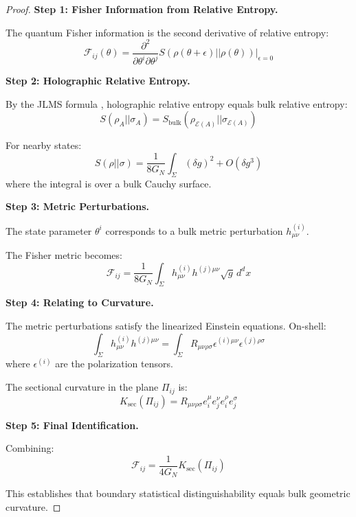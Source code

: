 \documentclass[12pt,a4paper]{article}
\begin{document}
\begin{proof}
\textbf{Step 1: Fisher Information from Relative Entropy.}

The quantum Fisher information is the second derivative of relative entropy:
\begin{equation}
\mathcal{F}_{ij}(\theta) = \frac{\partial^2}{\partial \theta^i \partial \theta^j} S(\rho(\theta + \epsilon) || \rho(\theta))\Big|_{\epsilon = 0}
\end{equation}

\textbf{Step 2: Holographic Relative Entropy.}

By the JLMS formula \cite{jafferis2016}, holographic relative entropy equals bulk relative entropy:
\begin{equation}
S(\rho_A || \sigma_A) = S_{\text{bulk}}(\rho_{\mathcal{E}(A)} || \sigma_{\mathcal{E}(A)})
\end{equation}

For nearby states:
\begin{equation}
S(\rho || \sigma) = \frac{1}{8G_N} \int_\Sigma (\delta g)^2 + O(\delta g^3)
\end{equation}
where the integral is over a bulk Cauchy surface.

\textbf{Step 3: Metric Perturbations.}

The state parameter $\theta^i$ corresponds to a bulk metric perturbation $h^{(i)}_{\mu\nu}$.

The Fisher metric becomes:
\begin{equation}
\mathcal{F}_{ij} = \frac{1}{8G_N} \int_\Sigma h^{(i)}_{\mu\nu} h^{(j)\mu\nu} \sqrt{g} \, d^d x
\end{equation}

\textbf{Step 4: Relating to Curvature.}

The metric perturbations satisfy the linearized Einstein equations. On-shell:
\begin{equation}
\int_\Sigma h^{(i)}_{\mu\nu} h^{(j)\mu\nu} = \int_\Sigma R_{\mu\nu\rho\sigma} \epsilon^{(i)\mu\nu} \epsilon^{(j)\rho\sigma}
\end{equation}
where $\epsilon^{(i)}$ are the polarization tensors.

The sectional curvature in the plane $\Pi_{ij}$ is:
\begin{equation}
K_{\text{sec}}(\Pi_{ij}) = R_{\mu\nu\rho\sigma} e_i^\mu e_j^\nu e_i^\rho e_j^\sigma
\end{equation}

\textbf{Step 5: Final Identification.}

Combining:
\begin{equation}
\mathcal{F}_{ij} = \frac{1}{4G_N} K_{\text{sec}}(\Pi_{ij})
\end{equation}

This establishes that boundary statistical distinguishability equals bulk geometric curvature.
\end{proof}
\end{document}
